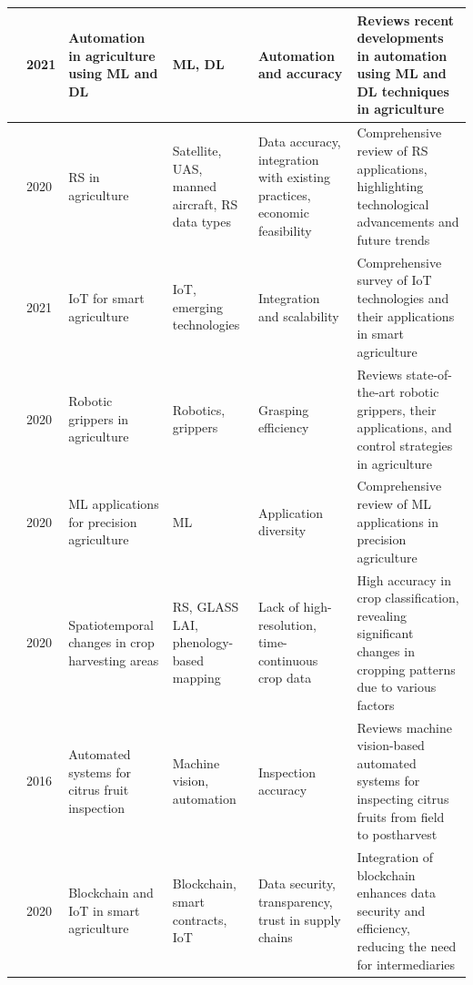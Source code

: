 \documentclass[a4paper,fleqn]{cas-dc}
\begin{document}
\begin{table}[ht]
\begin{tabular} {p{0.4cm}p{0.5cm}p{3cm}p{3.2cm}p{3cm}p{5cm}}
\cite{saleem2021automation} & 2021 & Automation in agriculture using ML and DL & ML, DL & Automation and accuracy & Reviews recent developments in automation using ML and DL techniques in agriculture \\ \midrule
\cite{khanal2020remote} & 2020 & RS in agriculture & Satellite, UAS, manned aircraft, RS data types & Data accuracy, integration with existing practices, economic feasibility & Comprehensive review of RS applications, highlighting technological advancements and future trends \\ \midrule
\cite{friha2021internet} & 2021 & IoT for smart agriculture & IoT, emerging technologies & Integration and scalability & Comprehensive survey of IoT technologies and their applications in smart agriculture \\ \midrule
\cite{zhang2020state} & 2020 & Robotic grippers in agriculture & Robotics, grippers & Grasping efficiency & Reviews state-of-the-art robotic grippers, their applications, and control strategies in agriculture \\ \midrule
\cite{sharma2020machine} & 2020 & ML applications for precision agriculture & ML & Application diversity & Comprehensive review of ML applications in precision agriculture \\ \midrule
\cite{luo2020identifying} & 2020 & Spatiotemporal changes in crop harvesting areas & RS, GLASS LAI, phenology-based mapping & Lack of high-resolution, time-continuous crop data & High accuracy in crop classification, revealing significant changes in cropping patterns due to various factors \\ \midrule
\cite{cubero2016automated} & 2016 & Automated systems for citrus fruit inspection & Machine vision, automation & Inspection accuracy & Reviews machine vision-based automated systems for inspecting citrus fruits from field to postharvest \\ \midrule
\cite{pranto2021blockchain} & 2020 & Blockchain and IoT in smart agriculture & Blockchain, smart contracts, IoT & Data security, transparency, trust in supply chains & Integration of blockchain enhances data security and efficiency, reducing the need for intermediaries \\ \midrule
\end{tabular}
\end{table}
\end{document}
